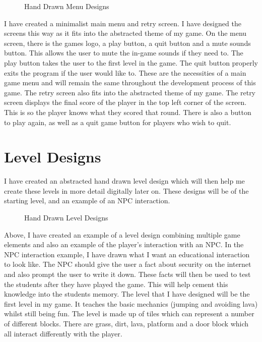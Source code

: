 \documentclass[12pt]{report}
\begin{document}
\begin{figure}[H]
    \centering
    \caption{Hand Drawn Menu Designs}
\end{figure}

I have created a minimalist main menu and retry screen. I have designed the screens this way as it fits into the abstracted theme of my game. On the menu screen, there is the games logo, a play button, a quit button and a mute sounds button. This allows the user to mute the in-game sounds if they need to. The play button takes the user to the first level in the game. The quit button properly exits the program if the user would like to. These are the necessities of a main game menu and will remain the same throughout the development process of this game. The retry screen also fits into the abstracted theme of my game. The retry screen displays the final score of the player in the top left corner of the screen. This is so the player knows what they scored that round. There is also a button to play again, as well as a quit game button for players who wish to quit.

\section{Level Designs}
I have created an abstracted hand drawn level design which will then help me create these levels in more detail digitally later on. These designs will be of the starting level, and an example of an NPC interaction.

\begin{figure}[H]
    \centering
    \caption{Hand Drawn Level Designs}
\end{figure}

\pagebreak

Above, I have created an example of a level design combining multiple game elements and also an example of the player's interaction with an NPC. In the NPC interaction example, I have drawn what I want an educational interaction to look like. The NPC should give the user a fact about security on the internet and also prompt the user to write it down. These facts will then be used to test the students after they have played the game. This will help cement this knowledge into the students memory. The level that I have designed will be the first level in my game. It teaches the basic mechanics (jumping and avoiding lava) whilst still being fun. The level is made up of tiles which can represent a number of different blocks. There are grass, dirt, lava, platform and a door block which all interact differently with the player. 
\end{document}
